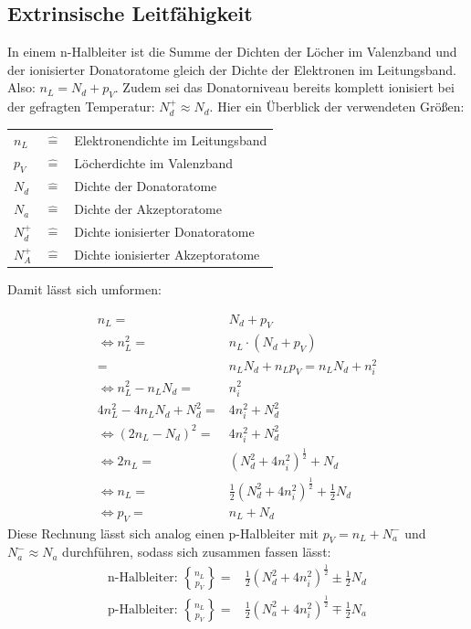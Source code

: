 \subsection{Extrinsische Leitfähigkeit}
In einem n-Halbleiter ist die Summe der Dichten der Löcher im Valenzband und der ionisierter Donatoratome gleich der Dichte der Elektronen im Leitungsband. Also: \(n_L = N_d + p_V\). Zudem sei das Donatorniveau bereits komplett ionisiert bei der gefragten Temperatur: \(N_d^+ \approx N_d\). Hier ein Überblick der verwendeten Größen:
\begin{table}[H]
\centering
\begin{tabular}{lcl}
\(n_L\) & \(\widehat{=}\) & Elektronendichte im Leitungsband\\
\(p_V\) & \(\widehat{=}\) & Löcherdichte im Valenzband\\
\(N_d\) & \(\widehat{=}\) & Dichte der Donatoratome\\
\(N_a\) & \(\widehat{=}\) & Dichte der Akzeptoratome\\
\(N_d^+\) & \(\widehat{=}\) & Dichte ionisierter Donatoratome\\
\(N_A^+\) & \(\widehat{=}\) & Dichte ionisierter Akzeptoratome\\
\end{tabular}
\end{table}

Damit lässt sich umformen:

\begin{align*}
 n_L =& N_d + p_V \\
\Leftrightarrow  n_L^2 =& n_L \cdot (N_d +p_V) \\
 =& n_L N_d + n_L p_V = n_L N_d + n_i^2 \\
\Leftrightarrow  n_L^2-n_L N_d =& n_i^2 \\
4n_L^2-4n_L N_d + N_d^2 =& 4n_i^2 + N_d^2 \\
\Leftrightarrow (2n_L-N_d)^2 =& 4n_i^2+ N_d^2 \\
\Leftrightarrow 2n_L =& (N_d^2+4n_i^2)^{\frac{1}{2}} +N_d \\
\Leftrightarrow n_L =& \frac{1}{2}(N_d^2+4n_i^2)^{\frac{1}{2}} +\frac{1}{2} N_d \\
\Leftrightarrow p_V =& n_L + N_d
\end{align*}
Diese Rechnung lässt sich analog einen p-Halbleiter mit \(p_V = n_L + N_a^-\) und \(N_a^-\approx N_a\) durchführen, sodass sich zusammen fassen lässt:
\begin{align}
\text{n-Halbleiter:   }
\genfrac{\{}{\}}{0pt}{}{n_L}{p_V} =& \frac{1}{2}(N_d^2+4n_i^2)^{\frac{1}{2}} \pm \frac{1}{2} N_d \\
\text{p-Halbleiter:   }
\genfrac{\{}{\}}{0pt}{}{n_L}{p_V} =& \frac{1}{2}(N_a^2+4n_i^2)^{\frac{1}{2}} \mp \frac{1}{2} N_a
\end{align}

